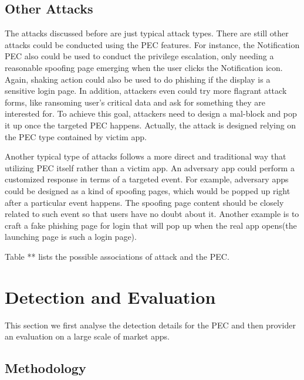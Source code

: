 \documentclass{sig-alternate-05-2015}
\begin{document}
\subsection{Other Attacks}
The attacks discussed before are just typical attack types. There are still other attacks could be conducted using the PEC features. For instance, the Notification PEC also could be used to conduct the privilege escalation, only needing a reasonable spoofing page emerging when the user clicks the Notification icon. Again, shaking action could also be used to do phishing if the display is a sensitive login page. In addition, attackers even could try more flagrant attack forms, like ransoming user's critical data and ask for something they are interested for. To achieve this goal, attackers need to design a mal-block and pop it up once the targeted PEC happens. Actually, the attack is designed relying on the PEC type contained by victim app.

Another typical type of attacks follows a more direct and traditional way that utilizing PEC itself rather than a victim app. An adversary app could perform a customized response in terms of a targeted event. For example, adversary apps could be designed as a kind of spoofing pages, which would be popped up right after a particular event happens. The spoofing page content should be closely related to such event so that users have no doubt about it. Another example is to craft a fake phishing page for login that will pop up when the real app opens(the launching page is such a login page).

Table ** lists the possible associations of attack and the PEC.


\section{Detection and Evaluation}
This section we first analyse the detection details for the PEC and then provider an evaluation on a large scale of market apps.
\subsection{Methodology}
\end{document}
